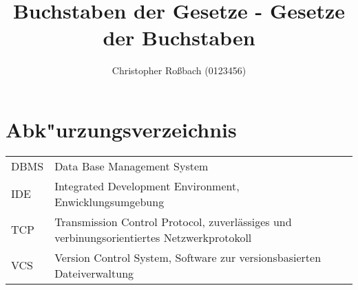 \title{Buchstaben der Gesetze - Gesetze der Buchstaben}
\author{%
  Christopher Ro\ss bach (0123456)%
}
\newpage
{
\tableofcontents
\clearpage
\listoffigures
\section*{Abk"urzungsverzeichnis} %
\begin{tabularx}{\textwidth}{l X}
  DBMS & Data Base Management System\\
  IDE & Integrated Development Environment, Enwicklungsumgebung\\
  TCP & Transmission Control Protocol, zuverlässiges und verbinungsorientiertes Netzwerkprotokoll\autocite{wiki.tcp}\\
  VCS & Version Control System, Software zur versionsbasierten Dateiverwaltung
\end{tabularx}
\lstlistoflistings
}
